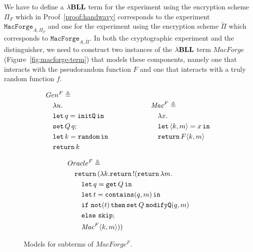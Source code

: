 We have to define a ${\lambda}\mathbf{BLL}$ term for the experiment using the encryption scheme $\Pi_F$ which in Proof~\ref{proof:handwavy} corresponds to the experiment $\mathtt{MacForge}_{A, \Pi_F}$ and one for the experiment using the encryption scheme $\widetilde{\Pi}$ which corresponds to $\mathtt{MacForge}_{A,\widetilde{\Pi}} $. In both the cryptographic experiment and the distinguisher, we need to construct two instances of the ${\lambda}\mathbf{BLL}$ term $\mathit{MacForge}$ (Figure~\ref{fig:macforge-term}) that models these components, namely one that interacts with the pseudorandom function $F$ and one that interacts with a truly random function $f$. 

\begin{figure}[ht]
    \begin{align*}
        \begin{aligned}
            &Gen^F \triangleq \\
            &\quad\lambda u. \\
            &\quad\mathtt{let}\,q=\mathtt{initQ}\,\mathtt{in}\, \\
            &\quad \mathtt{set}\,Q\,q; \\
            &\quad\mathtt{let}\,k=\mathtt{random}\,\mathtt{in}\, \\
            &\quad\mathtt{return}\, k
        \end{aligned}
        \qquad\qquad\qquad
        \begin{aligned}
            &\mathit{Mac}^F \triangleq \\
            &\quad\lambda x. \\
            &\quad\mathtt{let}\,\langle k,m \rangle=x\,\mathtt{in}\, \\
            &\quad\mathtt{return}\, F\langle k,m \rangle
        \end{aligned}
    \end{align*}
    
    \begin{align*}
        \begin{aligned}
            &Oracle^F \triangleq \\
            &\quad \mathtt{return}\,(\lambda k.\mathtt{return}\, \mathord{!}(\mathtt{return}\, \lambda m. \\
            &\quad\quad \mathtt{let}\,q=\mathtt{get}\, Q\,\mathtt{in}\, \\
            &\quad\quad \mathtt{let}\,t=\mathtt{contains}(q,m)\,\mathtt{in}\, \\
            &\quad\quad \mathtt{if}\ \mathtt{not}(t)\, \mathtt{then} \,\mathtt{set}\,Q\;\mathtt{modifyQ}(q,m) \\
            &\quad\quad \mathtt{else}\ \mathtt{skip}; \\
            &\quad\quad \mathit{Mac}^F\langle k,m \rangle))
        \end{aligned}
    \end{align*}
    \caption{Models for subterms of $MacForge^F$.}
    \label{fig:macforgeF-subterms}
\end{figure}

